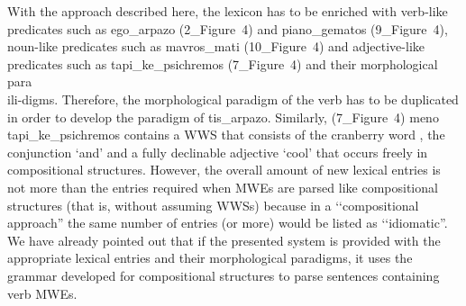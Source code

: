 \documentclass[output=paper,
modfonts
]{langscibook}
\begin{document}
\ili{}
With\ili{} the\ili{} approach\ili{} described\ili{} here\ili{},\ili{} the\ili{} lexicon\ili{} has\ili{} to\ili{} be\ili{} enriched\ili{} with\ili{} verb\ili{}-like\ili{} predicates\ili{} such\ili{} as\ili{} ego\ili{}\_arpazo\ili{} \ili{}(2\ili{}\_Figure\ili{}~4\ili{})\ili{} and\ili{} piano\ili{}\_gematos\ili{} \ili{}(9\ili{}\_Figure\ili{}~4\ili{})\ili{},\ili{} noun\ili{}-like\ili{} predicates\ili{} such\ili{} as\ili{} mavros\ili{}\_mati\ili{} \ili{}(10\ili{}\_Figure\ili{}~4\ili{})\ili{} and\ili{} adjective\ili{}-like\ili{} predicates\ili{} such\ili{} as\ili{} tapi\ili{}\_ke\ili{}\_psichremos\ili{} \ili{}(7\ili{}\_Figure\ili{}~4\ili{})\ili{} and\ili{} their\ili{} morphological\ili{} para\ili{}\\ili{}-digms\ili{}.\ili{} Therefore\ili{},\ili{} the\ili{} morphological\ili{} paradigm\ili{} of\ili{} the\ili{} verb\ili{} \ili{}\textit{}\ili{} has\ili{} to\ili{} be\ili{} duplicated\ili{} in\ili{} order\ili{} to\ili{} develop\ili{} the\ili{} paradigm\ili{} of\ili{} tis\ili{}\_arpazo\ili{}.\ili{} Similarly\ili{},\ili{} \ili{} \ili{}(7\ili{}\_Figure\ili{}~4\ili{})\ili{} meno\ili{} tapi\ili{}\_ke\ili{}\_psichremos\ili{} contains\ili{} a\ili{} \ili{} \ili{} WWS\ili{} that\ili{} consists\ili{} of\ili{} the\ili{} cranberry\ili{} word\ili{} \ili{}\textit{}\ili{},\ili{} the\ili{} conjunction\ili{} \ili{}\textit{}\ili{} \ili{}`and\ili{}'\ili{} and\ili{} a\ili{} fully\ili{} declinable\ili{} adjective\ili{} \ili{}\textit{}\ili{} \ili{}`cool\ili{}'\ili{} that\ili{} occurs\ili{} freely\ili{} in\ili{} compositional\ili{} structures\ili{}.\ili{} However\ili{},\ili{} the\ili{} overall\ili{} amount\ili{} of\ili{} new\ili{} lexical\ili{} entries\ili{} is\ili{} not\ili{} more\ili{} than\ili{} the\ili{} entries\ili{} required\ili{} when\ili{} MWEs\ili{} are\ili{} parsed\ili{} like\ili{} compositional\ili{} structures\ili{} \ili{}(that\ili{} is\ili{},\ili{} without\ili{} assuming\ili{} WWSs\ili{})\ili{} because\ili{} in\ili{} a\ili{} \ili{}`\ili{}`compositional\ili{} approach\ili{}”\ili{} the\ili{} same\ili{} number\ili{} of\ili{} entries\ili{} \ili{}(or\ili{} more\ili{})\ili{} would\ili{} be\ili{} listed\ili{} as\ili{} \ili{}`\ili{}`idiomatic\ili{}”\ili{}.\ili{} We\ili{} have\ili{} already\ili{} pointed\ili{} out\ili{} that\ili{} if\ili{} the\ili{} presented\ili{} system\ili{} is\ili{} provided\ili{} with\ili{} the\ili{} appropriate\ili{} lexical\ili{} entries\ili{} and\ili{} their\ili{} morphological\ili{} paradigms\ili{},\ili{} it\ili{} uses\ili{} the\ili{} grammar\ili{} developed\ili{} for\ili{} compositional\ili{} structures\ili{} to\ili{} parse\ili{} sentences\ili{} containing\ili{} verb\ili{} MWEs\ili{}.\ili{} \ili{}
\end{document}
